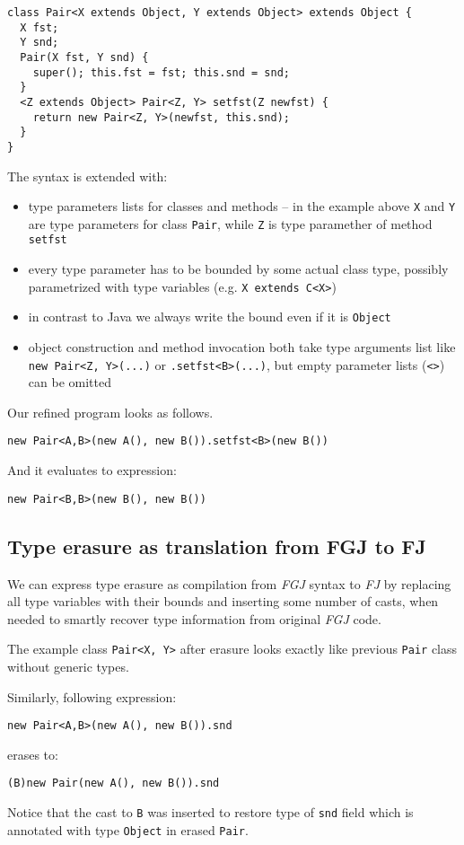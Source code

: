 \documentclass{article}[12pt]
\begin{document}
\begin{verbatim}
class Pair<X extends Object, Y extends Object> extends Object {
  X fst;
  Y snd;
  Pair(X fst, Y snd) {
    super(); this.fst = fst; this.snd = snd;
  }
  <Z extends Object> Pair<Z, Y> setfst(Z newfst) {
    return new Pair<Z, Y>(newfst, this.snd);
  }
}
\end{verbatim}
The syntax is extended with:

\begin{itemize}
\item type parameters lists for classes and methods -- in the example above \texttt{X} and \texttt{Y} are type parameters for class \texttt{Pair}, while \texttt{Z} is type paramether of method \texttt{setfst}
\item every type parameter has to be bounded by some actual class type, possibly parametrized with type variables (e.g. \texttt{X extends C<X>})
\item in contrast to Java we always write the bound even if it is \texttt{Object}
\item object construction and method invocation both take type arguments list like \texttt{new Pair<Z, Y>(...)} or \texttt{.setfst<B>(...)}, but empty parameter lists (\texttt{<>}) can be omitted
\end{itemize}
Our refined program looks as follows.

\begin{verbatim}
new Pair<A,B>(new A(), new B()).setfst<B>(new B())
\end{verbatim}
And it evaluates to expression:
\begin{verbatim}
new Pair<B,B>(new B(), new B())
\end{verbatim}

\subsection{Type erasure as translation from FGJ to FJ}

We can express type erasure as compilation from \emph{FGJ} syntax to \emph{FJ} by replacing all type variables with their bounds and inserting some number of casts, when needed to smartly recover type information from original \emph{FGJ} code.

The example class \texttt{Pair<X, Y>} after erasure looks exactly like previous \texttt{Pair} class without generic types.

Similarly, following expression:
\begin{verbatim}
new Pair<A,B>(new A(), new B()).snd
\end{verbatim}
erases to:
\begin{verbatim}
(B)new Pair(new A(), new B()).snd
\end{verbatim}
Notice that the cast to \texttt{B} was inserted to restore type of \texttt{snd} field which is annotated with type \texttt{Object} in erased \texttt{Pair}.
\end{document}
